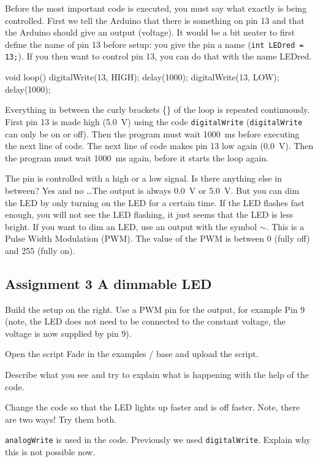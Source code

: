 \documentclass{arduino}
\begin{document}
Before the most important code is executed, you must say what exactly is being controlled. First we tell the Arduino that there is something on pin 13 and that the Arduino should give an output (voltage). It would be a bit neater to first define the name of pin 13 before setup: you give the pin a name (\lstinline{int LEDred = 13;}). If you then want to control pin 13, you can do that with the name LEDred.
\begin{marginlisting}
void loop() {
  digitalWrite(13, HIGH);
  delay(1000);
  digitalWrite(13, LOW);
  delay(1000);
}
\end{marginlisting}

Everything in between the curly brackets \{\} of the loop is repeated continuously. First pin 13 is made high (\SI{5.0}{\volt}) using the code \lstinline{digitalWrite} (\lstinline{digitalWrite} can only be on or off). Then the program must wait \SI{1000}{\milli\s} before executing the next line of code. The next line of code makes pin 13 low again (\SI{0.0}{\volt}). Then the program must wait \SI{1000}{\milli\s} again, before it starts the loop again.


The pin is controlled with a high or a low signal. Is there anything else in between? Yes and no \dots The output is always \SI{0.0}{\volt} or \SI{5.0}{\volt}. But you can dim the LED by only turning on the LED for a certain time. If the LED flashes fast enough, you will not see the LED flashing, it just seems that the LED is less bright. If you want to dim an LED, use an output with the symbol $\sim$. This is a Pulse Width Modulation (PWM). The value of the PWM is between 0 (fully off) and 255 (fully on).
\newpage

\subsection{Assignment 3 A dimmable LED}


\begin{alphalist}
\item Build the setup on the right. Use a PWM pin for the output, for example Pin 9 (note, the LED does not need to be connected to the constant voltage, the voltage is now supplied by pin 9).

\item Open the script Fade in the examples / base and upload the script.

\item Describe what you see and try to explain what is happening with the help of the code.

\item Change the code so that the LED lights up faster and is off faster. Note, there are two ways! Try them both.

\item \lstinline{analogWrite} is used in the code. Previously we used \lstinline{digitalWrite}. Explain why this is not possible now.
\end{alphalist}
\end{document}
